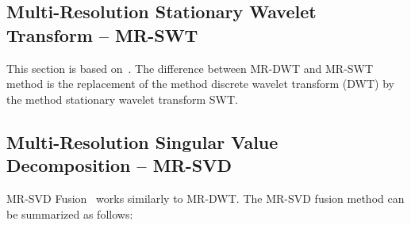\documentclass[journal]{IEEEtran}
\begin{document}
\subsection{Multi-Resolution Stationary Wavelet Transform -- MR-SWT}  
This section is based on~\cite{n_r, jjly}. The difference between MR-DWT and MR-SWT method is the replacement of the method discrete wavelet transform (DWT) by the method stationary wavelet transform SWT. 

\subsection{Multi-Resolution Singular Value Decomposition -- MR-SVD}

MR-SVD Fusion~\cite{naidu} works similarly to MR-DWT. 
The MR-SVD fusion method can be summarized as follows:
\end{document}
